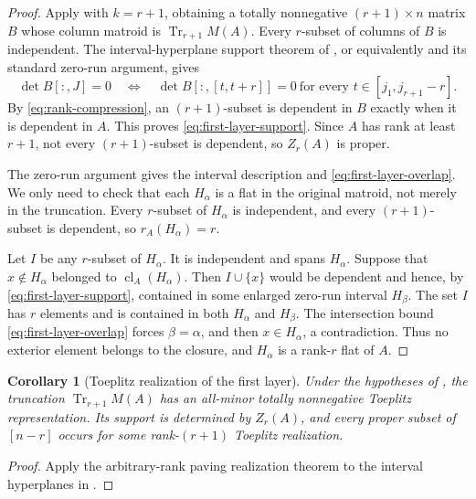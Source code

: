 \documentclass[11pt]{amsart}
\newtheorem{corollary}[theorem]{Corollary}
\theoremstyle{definition}
\theoremstyle{remark}
\newcommand{\Tr}{\operatorname{Tr}}
\begin{document}
\begin{proof}
Apply  with $k=r+1$, obtaining a totally nonnegative $(r+1)\times n$ matrix $B$ whose column matroid is $\Tr_{r+1}M(A)$.  Every $r$-subset of columns of $B$ is independent.  The interval-hyperplane support theorem of \cite[Theorem~10]{CGQpaving}, or equivalently  and its standard zero-run argument, gives
\[
 \det B[:,J]=0
 \quad\Longleftrightarrow\quad
 \det B[:,[t,t+r]]=0\ \text{for every }t\in[j_1,j_{r+1}-r].
\]
By \eqref{eq:rank-compression}, an $(r+1)$-subset is dependent in $B$ exactly when it is dependent in $A$.  This proves \eqref{eq:first-layer-support}.  Since $A$ has rank at least $r+1$, not every $(r+1)$-subset is dependent, so $Z_r(A)$ is proper.

The zero-run argument gives the interval description and \eqref{eq:first-layer-overlap}.  We only need to check that each $H_\alpha$ is a flat in the original matroid, not merely in the truncation.  Every $r$-subset of $H_\alpha$ is independent, and every $(r+1)$-subset is dependent, so $r_A(H_\alpha)=r$.

Let $I$ be any $r$-subset of $H_\alpha$.  It is independent and spans $H_\alpha$.  Suppose that $x\notin H_\alpha$ belonged to $\operatorname{cl}_A(H_\alpha)$.  Then $I\cup\{x\}$ would be dependent and hence, by \eqref{eq:first-layer-support}, contained in some enlarged zero-run interval $H_\beta$.  The set $I$ has $r$ elements and is contained in both $H_\alpha$ and $H_\beta$.  The intersection bound \eqref{eq:first-layer-overlap} forces $\beta=\alpha$, and then $x\in H_\alpha$, a contradiction.  Thus no exterior element belongs to the closure, and $H_\alpha$ is a rank-$r$ flat of $A$.
\end{proof}

\begin{corollary}[Toeplitz realization of the first layer]\label{cor:first-layer-toeplitz}
Under the hypotheses of , the truncation $\Tr_{r+1}M(A)$ has an all-minor totally nonnegative Toeplitz representation.  Its support is determined by $Z_r(A)$, and every proper subset of $[n-r]$ occurs for some rank-$(r+1)$ Toeplitz realization.
\end{corollary}

\begin{proof}
Apply the arbitrary-rank paving realization theorem \cite[Theorem~1]{CGQpaving} to the interval hyperplanes in .
\end{proof}
\end{document}
